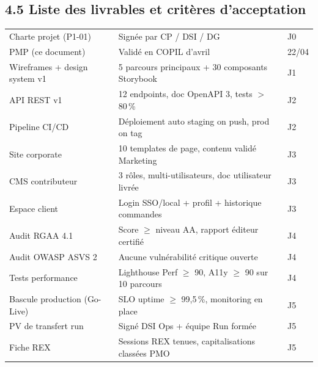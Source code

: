 \documentclass[11pt,a4paper,oneside]{report}
\begin{document}
\subsection*{4.5 Liste des livrables et critères d'acceptation}
\renewcommand{\arraystretch}{1.3}
\begin{tabularx}{\textwidth}{L{3.5cm} Y C{2cm}}
\toprule
{} &  &  \\
\midrule
Charte projet (P1-01)         & Signée par CP / DSI / DG & J0 \\
PMP (ce document)             & Validé en COPIL d'avril & 22/04 \\
Wireframes + design system v1 & 5 parcours principaux + 30 composants Storybook & J1 \\
API REST v1                   & 12 endpoints, doc OpenAPI 3, tests $>$ 80\,\% & J2 \\
Pipeline CI/CD                & Déploiement auto staging on push, prod on tag & J2 \\
Site corporate                & 10 templates de page, contenu validé Marketing & J3 \\
CMS contributeur              & 3 rôles, multi-utilisateurs, doc utilisateur livrée & J3 \\
Espace client                 & Login SSO/local + profil + historique commandes & J3 \\
Audit RGAA 4.1                & Score $\geq$ niveau AA, rapport éditeur certifié & J4 \\
Audit OWASP ASVS 2            & Aucune vulnérabilité critique ouverte & J4 \\
Tests performance             & Lighthouse Perf $\geq$ 90, A11y $\geq$ 90 sur 10 parcours & J4 \\
Bascule production (Go-Live)  & SLO uptime $\geq$ 99{,}5\,\%, monitoring en place & J5 \\
PV de transfert run           & Signé DSI Ops + équipe Run formée & J5 \\
Fiche REX                     & Sessions REX tenues, capitalisations classées PMO & J5 \\
\bottomrule
\end{tabularx}

\newpage
\end{document}
